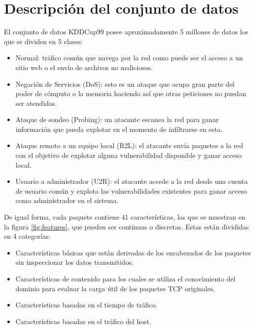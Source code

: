 \section{Descripción del conjunto de datos}\label{section:dataset_description}
El conjunto de datos KDDCup99 posee aproximadamente 5 millones de datos los que se dividen en 5 clases:

\begin{itemize}
    \item Normal: tráfico común que navega por la red como puede ser el acceso a un sitio web o el envío de archivos no maliciosos.
    \item Negación de Servicios (DoS): esto es un ataque que ocupa gran parte del poder de cómputo o la memoria haciendo así que otras peticiones no puedan ser atendidas.
    \item Ataque de sondeo (Probing): un atacante escanea la red para ganar información que pueda explotar en el momento de infiltrarse en esta.
    \item Ataque remoto a un equipo local (R2L): el atacante envía paquetes a la red con el objetivo de explotar alguna vulnerabilidad disponible y ganar acceso local.
    \item Usuario a administrador (U2R): el atacante accede a la red desde una cuenta de usuario común y explota las vulnerabilidades existentes para ganar acceso como administrador en el sistema.
\end{itemize}

De igual forma, cada paquete contiene 41 características, las que se muestran en la figura \ref{fig:features}, que pueden ser continuas o discretas. Estas están divididas en 4 categorías:

\begin{itemize}
    \item Características básicas que están derivadas de los encabezados de los paquetes sin inspeccionar los datos transmitidos.
    \item Características de contenido para los cuales se utiliza el conocimiento del dominio para evaluar la carga útil de los paquetes TCP originales.
    \item Características basadas en el tiempo de tráfico.
    \item Características basadas en el tráfico del host.
\end{itemize}

